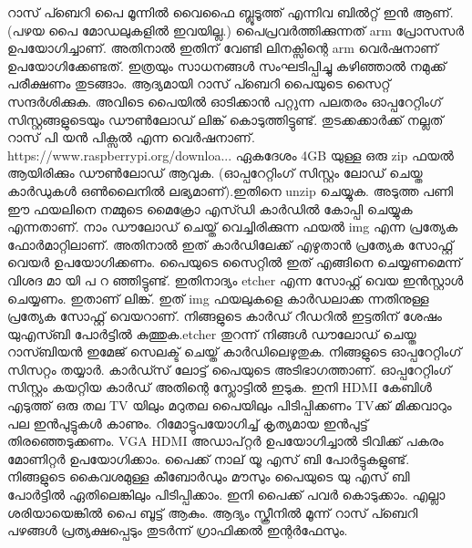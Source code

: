 \documentclass[10pt,a4paper]{report}
\begin{document}
റാസ് പ്ബെറി പൈ മൂന്നിൽ വൈഫൈ ബ്ലൂടൂത്ത് എന്നിവ ബിൽറ്റ് ഇൻ ആണ്. (പഴയ പൈ മോഡലുകളിൽ ഇവയില്ല.) പൈപ്രവർത്തിക്കുന്നത് arm പ്രോസസർ ഉപയോഗിച്ചാണ്. അതിനാൽ ഇതിന് വേണ്ടി ലിനക്സിന്റെ arm വെർഷനാണ് ഉപയോഗിക്കേണ്ടത്.
ഇത്രയും സാധനങ്ങൾ സംഘടിപ്പിച്ചു കഴിഞ്ഞാൽ നമുക്ക് പരീക്ഷണം തുടങ്ങാം.
ആദ്യമായി റാസ് പ്ബെറി പൈയുടെ സൈറ്റ് സന്ദർശിക്കുക. അവിടെ പൈയിൽ ഓടിക്കാൻ പറ്റുന്ന പലതരം ഓപ്പറേറ്റിംഗ് സിസ്റ്റങ്ങളുടെയും ഡൗൺലോഡ് ലിങ്ക് കൊടുത്തിട്ടുണ്ട്. തുടക്കക്കാർക്ക് നല്ലത് റാസ് പി യൻ  പിക്സൽ എന്ന വെർഷനാണ്. https://www.raspberrypi.org/downloa...
ഏകദേശം 4GB യുള്ള ഒരു zip ഫയൽ ആയിരിക്കും ഡൗൺലോഡ് ആവുക. (ഓപ്പറേറ്റിംഗ് സിസ്റ്റം ലോഡ് ചെയ്ത കാർഡുകൾ ഒൺലൈനിൽ ലഭ്യമാണ്).ഇതിനെ unzip ചെയ്യുക.
 അടുത്ത പണി ഈ ഫയലിനെ നമ്മുടെ മൈക്രോ എസ്ഡി കാർഡിൽ കോപ്പി ചെയ്യുക എന്നതാണ്. നാം ഡൗലോഡ്‌ ചെയ്ത് വെച്ചിരിക്കുന്ന ഫയൽ img എന്ന പ്രത്യേക ഫോർമാറ്റിലാണ്. അതിനാൽ ഇത് കാർഡിലേക്ക് എഴുതാൻ പ്രത്യേക സോഫ്റ്റ് വെയർ ഉപയോഗിക്കണം. പൈയുടെ സൈറ്റിൽ ഇത് എങ്ങിനെ ചെയ്യണമെന്ന് വിശദ മാ യി പ റ ഞ്ഞിട്ടുണ്ട്. 
ഇതിനാദ്യം etcher എന്ന സോഫ്റ്റ് വെയ ഇൻസ്റ്റാൾ ചെയ്യണം. ഇതാണ് ലിങ്ക്. ഇത് img ഫയലുകളെ കാർഡലാക്ക ന്നതിനുള്ള പ്രത്യേക സോഫ്റ്റ് വെയറാണ്. നിങ്ങളുടെ കാർഡ് റീഡറിൽ ഇട്ടതിന് ശേഷം യുഎസ്ബി പോർട്ടിൽ കുത്തുക.etcher തുറന്ന് നിങ്ങൾ ഡൗലോഡ് ചെയ്ത റാസ്ബിയൻ ഇമേജ് സെലക്ട് ചെയ്ത് കാർഡിലെഴുതുക. നിങ്ങളുടെ ഓപ്പറേറ്റിംഗ് സിസറ്റം തയ്യാർ. കാർഡ്സ് ലോട്ട് പൈയുടെ അടിഭാഗത്താണ്. ഓപ്പറേറ്റിംഗ് സിസ്റ്റം കയറ്റിയ കാർഡ് അതിന്റെ സ്ലോട്ടിൽ ഇടുക.
ഇനി HDMI കേബിൾ എടുത്ത് ഒരു തല TV യിലും മറുതല പൈയിലും പിടിപ്പിക്കണം TVക്ക് മിക്കവാറും പല ഇൻപുട്ടുകൾ കാണും. റിമോട്ടുപയോഗിച്ച് കൃത്യമായ ഇൻപുട്ട് തിരഞ്ഞെടുക്കണം. VGA HDMI അഡാപ്റ്റർ ഉപയോഗിച്ചാൽ ടിവിക്ക് പകരം മോണിറ്റർ ഉപയോഗിക്കാം.
പൈക്ക് നാല് യൂ എസ് ബി പോർട്ടുകളുണ്ട്. നിങ്ങളുടെ കൈവശമുള്ള കീബോർഡും മൗസും പൈയുടെ യു എസ് ബി പോർട്ടിൽ ഏതിലെങ്കിലും പിടിപ്പിക്കാം. ഇനി പൈക്ക് പവർ കൊടുക്കാം. എല്ലാ ശരിയായെങ്കിൽ പൈ ബൂട്ട് ആകും. ആദ്യം സ്ക്രീനിൽ മൂന്ന് റാസ് പ്ബെറി പഴങ്ങൾ പ്രത്യക്ഷപ്പെടും തുടർന്ന് ഗ്രാഫിക്കൽ ഇന്റർഫേസും.
\end{document}
